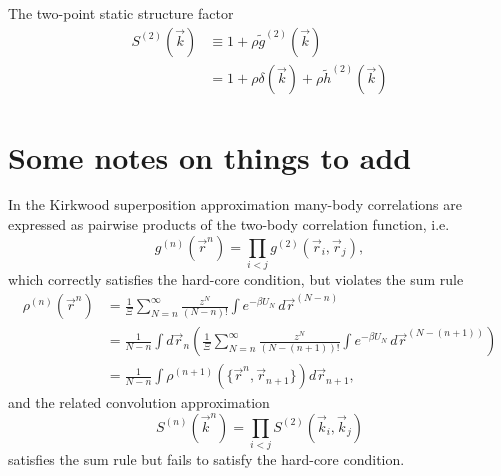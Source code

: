 \documentclass[12pt]{report}
\begin{document}
The two-point static structure factor
\begin{equation}
  \begin{aligned}
    S^{(2)}(\vec{k}) &\equiv 1 + \rho \tilde{g}^{(2)}(\vec{k}) \\
    &= 1 + \rho \delta(\vec{k}) + \rho \tilde{h}^{(2)}(\vec{k})
  \end{aligned}
\end{equation}

\section{Some notes on things to add}

In the Kirkwood superposition approximation \cite{Kirkwood1935} many-body correlations are expressed as pairwise products of the two-body correlation function, i.e.
\begin{equation}
  g^{(n)}(\vec{r}^n) =
  \prod_{i < j} g^{(2)}(\vec{r}_i, \vec{r}_j),
\end{equation}
which correctly satisfies the hard-core condition, but violates the sum rule
\begin{equation}
  \begin{aligned}
    \rho^{(n)}(\vec{r}^n) &=
    \frac{1}{\Xi} \sum_{N=n}^\infty \frac{z^N}{(N-n)!} \int e^{-\beta U_N} \, d\vec{r}^{(N-n)} \\
    &=
    \frac{1}{N-n}
    \int d\vec{r}_n \left(
    \frac{1}{\Xi} \sum_{N=n}^\infty \frac{z^N}{(N-(n+1))!} \int e^{-\beta U_N} \, d\vec{r}^{(N-(n+1))}
    \right) \\
    &=
    \frac{1}{N-n}
    \int \rho^{(n+1)}(\{\vec{r}^n, \vec{r}_{n+1}\}) d\vec{r}_{n+1},
  \end{aligned}
\end{equation}
and the related convolution approximation \cite{Barrat1988}%
\begin{equation}
  S^{(n)}(\vec{k}^n) =
  \prod_{i < j} S^{(2)}(\vec{k}_i, \vec{k}_j)
\end{equation}
satisfies the sum rule but fails to satisfy the hard-core condition.

\end{document}
